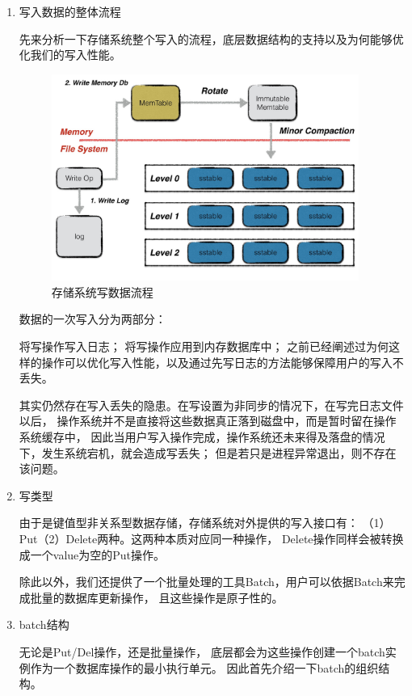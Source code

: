 	\begin{enumerate}
		\item 写入数据的整体流程
			
		先来分析一下存储系统整个写入的流程，底层数据结构的支持以及为何能够优化我们的写入性能。
		
		\begin{figure}[H]
			\centering
			\includegraphics[width=0.95\textwidth]{images/write_op}
			\caption{存储系统写数据流程}
			\label{write_op}
		\end{figure}

		数据的一次写入分为两部分：

		将写操作写入日志；
		将写操作应用到内存数据库中；
		之前已经阐述过为何这样的操作可以优化写入性能，以及通过先写日志的方法能够保障用户的写入不丢失。

		其实仍然存在写入丢失的隐患。在写设置为非同步的情况下，在写完日志文件以后，
		操作系统并不是直接将这些数据真正落到磁盘中，而是暂时留在操作系统缓存中，
		因此当用户写入操作完成，操作系统还未来得及落盘的情况下，发生系统宕机，就会造成写丢失；
		但是若只是进程异常退出，则不存在该问题。

		\item 写类型
		
		由于是键值型非关系型数据存储，存储系统对外提供的写入接口有：
		（1）Put（2）Delete两种。这两种本质对应同一种操作，
		Delete操作同样会被转换成一个value为空的Put操作。
	
		除此以外，我们还提供了一个批量处理的工具Batch，用户可以依据Batch来完成批量的数据库更新操作，
		且这些操作是原子性的。

		\item batch结构
		
		无论是Put/Del操作，还是批量操作，
		底层都会为这些操作创建一个batch实例作为一个数据库操作的最小执行单元。
		因此首先介绍一下batch的组织结构。


\end{enumerate}
